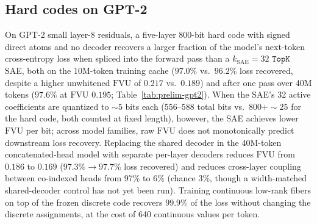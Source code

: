 \subsection{Hard codes on GPT-2}
\label{sec:prelim-gpt2}
On GPT-2 small layer-8 residuals, a five-layer 800-bit hard code with
signed direct atoms and no decoder recovers a larger fraction of the
model's next-token cross-entropy loss when spliced into the forward pass
than a $k_{\mathrm{SAE}}{=}32$ $\mathop{\mathtt{TopK}}\limits$ SAE, both on the 10M-token
training cache ($97.0\%$ vs.\ $96.2\%$ loss recovered, despite a higher
unwhitened $\mathrm{FVU}$ of $0.217$ vs.\ $0.189$) and after one pass
over 40M tokens ($97.6\%$ at $\mathrm{FVU}$ $0.195$;
Table~\ref{tab:prelim-gpt2}). When the SAE's 32 active coefficients are
quantized to ${\sim}5$ bits each (556--588 total bits vs.\ $800 + {\sim}25$
for the hard code, both counted at fixed length), however, the SAE
achieves lower $\mathrm{FVU}$ per bit; across model families, raw $\mathrm{FVU}$ does not monotonically
predict downstream loss recovery. Replacing the shared decoder in the
40M-token concatenated-head model with separate per-layer decoders
reduces $\mathrm{FVU}$ from $0.186$ to $0.169$ ($97.3\% \to 97.7\%$ loss
recovered) and reduces cross-layer coupling between co-indexed heads from
97\% to 6\% (chance 3\%, though a width-matched shared-decoder control
has not yet been run). Training continuous low-rank fibers on top of the
frozen discrete code recovers $99.9\%$ of the loss without changing the
discrete assignments, at the cost of 640 continuous values per token.

